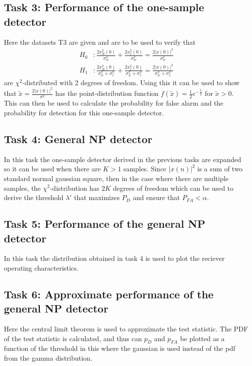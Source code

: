 \subsection{Task 3: Performance of the one-sample detector}
Here the datasets T3 are given and are to be used to verify that
\begin{align}
	H_0 &: \frac{2x_R^2(0)}{\sigma_w^2}+\frac{2x_I^2(0)}{\sigma_w^2}=\frac{2|x(0)|^2}{\sigma_w^2}\label{eq:chi_sq_h0}\\
	H_1 &: \frac{2x_R^2(0)}{\sigma_w^2+\sigma_s^2}+\frac{2x_I^2(0)}{\sigma_w^2+\sigma_s^2}=\frac{2|x(0)|^2}{\sigma_w^2+\sigma_s^2}\label{eq:chi_sq_h1}
\end{align}
are $\chi^2$-distributed with 2 degrees of freedom. Using this it can be used to show that $\widetilde{x} = \frac{2|x(0)|^2}{\sigma^2}$ has the point-distribution function $f(\widetilde{x}) = \frac{1}{2}e^{-\frac{\widetilde{x}}{2}}$ for $\widetilde{x}>0$. This can then be used to calculate the probability for false alarm and the probability for detection for this one-sample detector.

\subsection{Task 4: General NP detector}
In this task the one-sample detector derived in the previous tasks are expanded so it can be used when there are $K>1$ samples. Since $|x(n)|^2$ is a sum of two standard normal gaussian square, then in the case where there are multiple samples, the $\chi^2$-distribution has $2K$ degrees of freedom which can be used to derive the threshold $\lambda'$ that maximizes $P_D$ and ensure that $P_{FA}<\alpha$.

\subsection{Task 5: Performance of the general NP detector}
In this task the distribution obtained in task 4 is used to plot the reciever operating characteristics.

\subsection{Task 6: Approximate performance of the general NP detector}
Here the central limit theorem is used to approximate the test statistic. The PDF of the test statistic is calculated, and thus can $p_D$ and $p_{FA}$ be plotted as a function of the threshold in this where the gaussian is used instead of the pdf from the gamma distribution.

